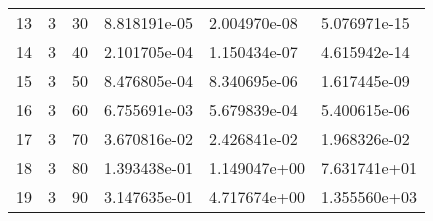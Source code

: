 \documentclass{article}
\begin{document}
{\begin{tabular}{llllll}
13 &         3 &         30 &  8.818191e-05 &          2.004970e-08 &                      5.076971e-15 \\
14 &         3 &         40 &  2.101705e-04 &          1.150434e-07 &                      4.615942e-14 \\
15 &         3 &         50 &  8.476805e-04 &          8.340695e-06 &                      1.617445e-09 \\
16 &         3 &         60 &  6.755691e-03 &          5.679839e-04 &                      5.400615e-06 \\
17 &         3 &         70 &  3.670816e-02 &          2.426841e-02 &                      1.968326e-02 \\
18 &         3 &         80 &  1.393438e-01 &          1.149047e+00 &                      7.631741e+01 \\
19 &         3 &         90 &  3.147635e-01 &          4.717674e+00 &                      1.355560e+03 \\
\bottomrule
\end{tabular}
}
\end{document}
